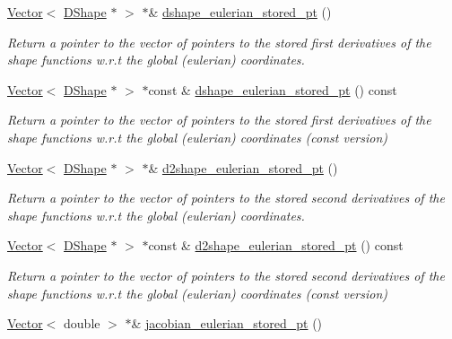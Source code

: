 \begin{DoxyCompactItemize}
\hyperlink{classoomph_1_1Vector}{Vector}$<$ \hyperlink{classoomph_1_1DShape}{D\+Shape} $\ast$ $>$ $\ast$\& \hyperlink{classoomph_1_1StorableShapeElementBase_a7570ad21479b51361f2e7ac68af93387}{dshape\+\_\+eulerian\+\_\+stored\+\_\+pt} ()
\begin{DoxyCompactList}\small\item\em Return a pointer to the vector of pointers to the stored first derivatives of the shape functions w.\+r.\+t the global (eulerian) coordinates. \end{DoxyCompactList}\item 
\hyperlink{classoomph_1_1Vector}{Vector}$<$ \hyperlink{classoomph_1_1DShape}{D\+Shape} $\ast$ $>$ $\ast$const  \& \hyperlink{classoomph_1_1StorableShapeElementBase_a2749bd3901bf30859e463c2342161fbe}{dshape\+\_\+eulerian\+\_\+stored\+\_\+pt} () const
\begin{DoxyCompactList}\small\item\em Return a pointer to the vector of pointers to the stored first derivatives of the shape functions w.\+r.\+t the global (eulerian) coordinates (const version) \end{DoxyCompactList}\item 
\hyperlink{classoomph_1_1Vector}{Vector}$<$ \hyperlink{classoomph_1_1DShape}{D\+Shape} $\ast$ $>$ $\ast$\& \hyperlink{classoomph_1_1StorableShapeElementBase_a536372ec41ec0216a79a01d363364712}{d2shape\+\_\+eulerian\+\_\+stored\+\_\+pt} ()
\begin{DoxyCompactList}\small\item\em Return a pointer to the vector of pointers to the stored second derivatives of the shape functions w.\+r.\+t the global (eulerian) coordinates. \end{DoxyCompactList}\item 
\hyperlink{classoomph_1_1Vector}{Vector}$<$ \hyperlink{classoomph_1_1DShape}{D\+Shape} $\ast$ $>$ $\ast$const  \& \hyperlink{classoomph_1_1StorableShapeElementBase_af5d9e3e3c93ea3b6cfd6be4e585044f3}{d2shape\+\_\+eulerian\+\_\+stored\+\_\+pt} () const
\begin{DoxyCompactList}\small\item\em Return a pointer to the vector of pointers to the stored second derivatives of the shape functions w.\+r.\+t the global (eulerian) coordinates (const version) \end{DoxyCompactList}\item 
\hyperlink{classoomph_1_1Vector}{Vector}$<$ double $>$ $\ast$\& \hyperlink{classoomph_1_1StorableShapeElementBase_abbbdffd61883ede9cdfede77bc1c59f8}{jacobian\+\_\+eulerian\+\_\+stored\+\_\+pt} ()

\end{DoxyCompactItemize}
